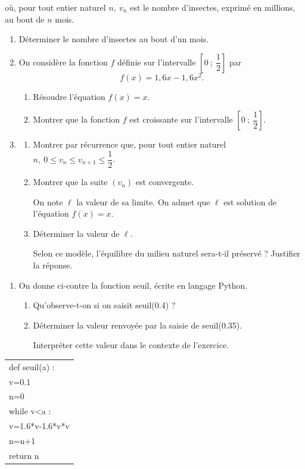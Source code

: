 \documentclass[10pt]{article}
\begin{document}
où, pour tout entier naturel $n,\: v_n$ est le nombre d'insectes, exprimé en millions, au bout de $n$ mois.

\medskip

\begin{enumerate}
\item Déterminer le nombre d'insectes au bout d'un mois.
\item On considère la fonction $f$ définie sur l'intervalle $\left[0~;~\dfrac12\right]$ par
\[f(x) = 1,6x - 1,6x^2.\]

	\begin{enumerate}
		\item Résoudre l'équation $f(x) = x$.
		\item Montrer que la fonction $f$ est croissante sur l'intervalle $\left[0~;~\dfrac12\right]$.
	\end{enumerate}
\item 
	\begin{enumerate}
		\item Montrer par récurrence que, pour tout entier naturel $n,\: 0 \leqslant v_n  \leqslant  v_{n+1} \leqslant  \dfrac12$.
		\item Montrer que la suite $\left(v_n\right)$ est convergente.
		
On note $\ell$ la valeur de sa limite. On admet que $\ell$ est solution de l'équation $f(x) = x$.
		\item Déterminer la valeur de $\ell$. 
		
Selon ce modèle, l'équilibre du milieu naturel sera-t-il préservé ? Justifier la réponse.
	\end{enumerate}	
\end{enumerate}
\begin{minipage}{0.6\linewidth}
\begin{enumerate}[resume]
\item  On donne ci-contre la fonction seuil, écrite en langage Python.
	\begin{enumerate}
		\item Qu'observe-t-on si on saisit seuil(0.4) ?
		\item Déterminer la valeur renvoyée par la saisie de seuil(0.35).
		
Interpréter cette valeur dans le contexte de l'exercice.
	\end{enumerate}
\end{enumerate}	
\end{minipage}\hfill
\begin{minipage}{0.36\linewidth}
\begin{tabularx}{\linewidth}{|X|}\hline
def seuil(a) :\\
\qquad v=0.1\\
\qquad n=0\\
\qquad while v<a :\\
\qquad \qquad v=1.6*v-1.6*v*v\\
\qquad \qquad n=n+1\\
\qquad return n\\ \hline
\end{tabularx}
\end{minipage}

\bigskip
\end{document}

